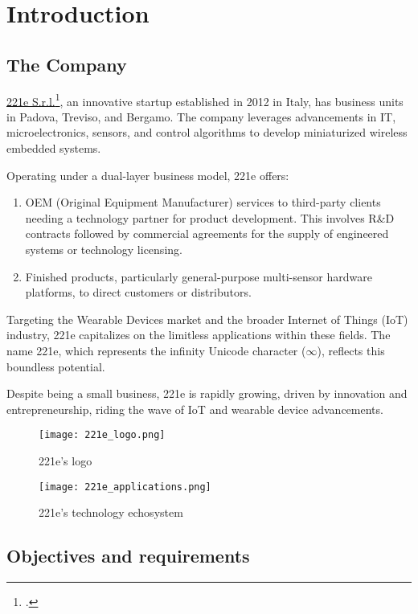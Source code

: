 \chapter{Introduction}
\label{cap:introduction}

\section{The Company}
\href{https://www.221e.com/about-us}{221e S.r.l.}\footcite{site:221e}, an innovative startup established in 2012 in Italy, has business units in Padova, Treviso, and Bergamo. The company leverages advancements in IT, microelectronics, sensors, and control algorithms to develop miniaturized wireless embedded systems.

Operating under a dual-layer business model, 221e offers:
\begin{enumerate}
    \item OEM (Original Equipment Manufacturer) services to third-party clients needing a technology partner for product development. This involves R\&D contracts followed by commercial agreements for the supply of engineered systems or technology licensing.
    \item Finished products, particularly general-purpose multi-sensor hardware platforms, to direct customers or distributors.
\end{enumerate}

Targeting the Wearable Devices market and the broader Internet of Things (IoT) industry, 221e capitalizes on the limitless applications within these fields. The name 221e, which represents the infinity Unicode character (\(\infty\)), reflects this boundless potential.

Despite being a small business, 221e is rapidly growing, driven by innovation and entrepreneurship, riding the wave of IoT and wearable device advancements.

\begin{figure}[htbp]
    \centering
    \texttt{[image: 221e\_logo.png]}
    \caption{221e's logo}
\end{figure}

\begin{figure}[htbp]
    \centering
    \texttt{[image: 221e\_applications.png]}
    \caption{221e's technology echosystem}
\end{figure}


\newpage
\section{Objectives and requirements}
\label{sec:objectives-and-requirements}

